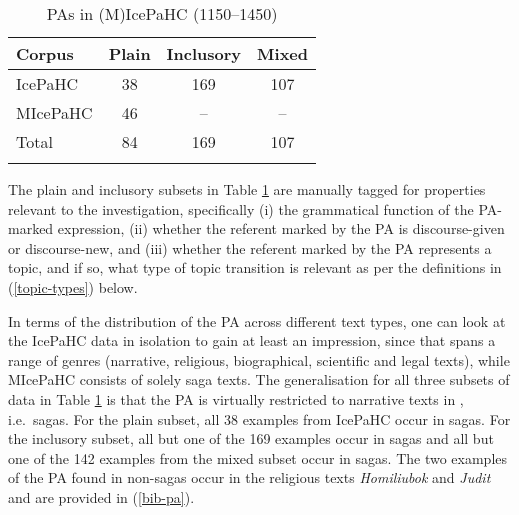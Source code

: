 \documentclass[output=paper,colorlinks,citecolor=brown]{langscibook}
\begin{document}
\begin{table}
    \caption{PAs in (M)IcePaHC (1150–1450)}
    \label{tab:all}
 \begin{tabular}{lccc}
  \lsptoprule
    Corpus   &  Plain &  Inclusory & Mixed\\
  \midrule
    IcePaHC   & 38 & 169 & 107 \\
    MIcePaHC   & 46 & -- &  --\\
    \midrule 
        Total  & 84 & 169 & 107 \\
  \lspbottomrule
 \end{tabular}
\end{table}


The plain and inclusory subsets in Table \ref{tab:all} are manually tagged for properties relevant to the investigation, specifically (i) the grammatical function of the PA-marked expression, (ii) whether the referent marked by the PA is discourse-given or discourse-new, and (iii) whether the referent marked by the PA represents a topic, and if so, what type of topic transition is relevant as per the definitions in (\ref{topic-types}) below.


In terms of the distribution of the PA across different text types, one can look at the IcePaHC data in isolation to gain at least an impression, since that  spans a range of genres (narrative, religious, biographical, scientific and legal texts), while MIcePaHC consists of solely saga texts. The generalisation for all three subsets of data in Table \ref{tab:all} is that the PA is virtually restricted to narrative texts in , i.e.~sagas. For the plain subset, all 38 examples from IcePaHC occur in sagas. For the inclusory subset, all but one of the 169 examples occur in sagas and all but one of the 142 examples from the mixed subset occur in sagas. The two examples of the PA found in non-sagas occur in  the religious texts \textit{Homiliubok} and \textit{Judit} and are provided in (\ref{bib-pa}).

\ea \label{bib-pa} 
\z 
\z
\end{document}
